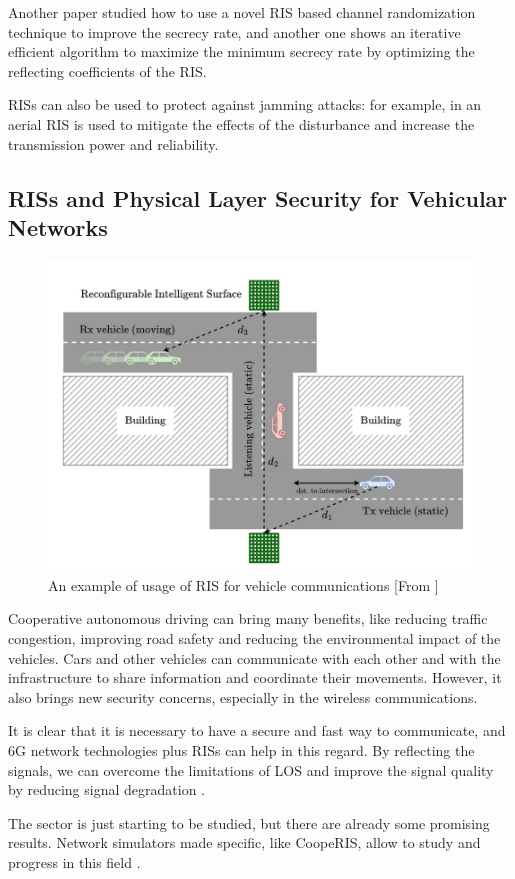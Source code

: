 Another paper \cite{s21041439} studied how to use a novel RIS based channel randomization technique to improve the secrecy rate, and another one \cite{8742603} shows an iterative efficient algorithm to maximize the minimum secrecy rate by optimizing the reflecting coefficients of the RIS.

RISs can also be used to protect against jamming attacks: for example, in \cite{9424472} an aerial RIS is used to mitigate the effects of the disturbance and increase the transmission power and reliability.

\subsection{RISs and Physical Layer Security for Vehicular Networks}

\begin{figure}[H]
  \centering
  \includegraphics[width=0.5\linewidth]{imgs/RIS vehicles.png}
  \caption{An example of usage of RIS for vehicle communications [From \cite{SEGATA2024110443}]}
\end{figure}

Cooperative autonomous driving can bring many benefits, like reducing traffic congestion, improving road safety and reducing the environmental impact of the vehicles. Cars and other vehicles can communicate with each other and with the infrastructure to share information and coordinate their movements. However, it also brings new security concerns, especially in the wireless communications.

It is clear that it is necessary to have a secure and fast way to communicate, and 6G network technologies plus RISs can help in this regard. By reflecting the signals, we can overcome the limitations of LOS and improve the signal quality by reducing signal degradation \cite{10715713}.

The sector is just starting to be studied, but there are already some promising results. Network simulators made specific, like CoopeRIS, allow to study and progress in this field \cite{SEGATA2024110443}.

